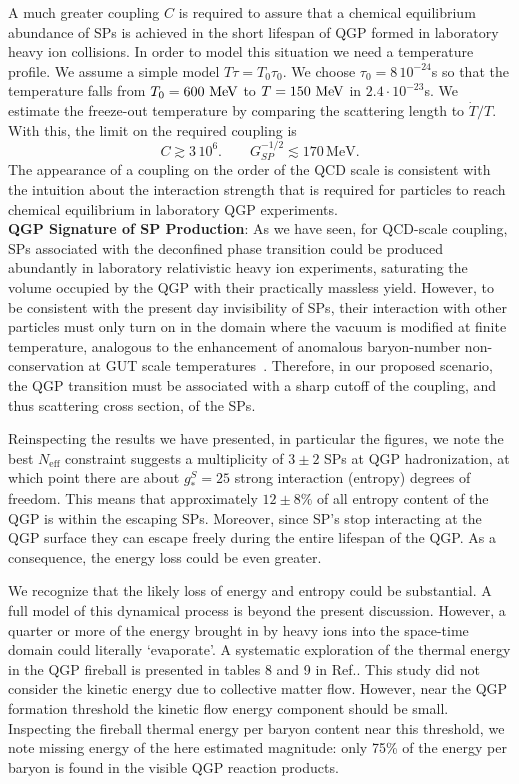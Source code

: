 A much greater coupling $C$ is required to assure that a chemical equilibrium abundance of SPs is achieved in the short lifespan of QGP formed in laboratory  heavy ion collisions. In order to model this situation we need a   temperature profile. We assume a simple model $T\tau =T_0\tau_0$. We choose  $\tau_0=8\, 10^{-24}$s  so that the temperature  falls from $T_0=600\text{ MeV}$ to $T=150\text{ MeV}$ in   $2.4\cdot 10^{-23}$s. We estimate the freeze-out temperature by comparing the scattering length to $\dot{T}/T$. With this, the limit on the required coupling is
\begin{equation}
C\gtrsim 3\, 10^6. \quad \quad   G_{SP}^{-1/2}\lesssim  170\,\mathrm{MeV}.
\end{equation}
The appearance of a coupling on the order of the QCD scale  is consistent with the intuition about the interaction strength that is required for   particles to reach chemical equilibrium in laboratory  QGP experiments.\\[-0.2cm]

{\bf QGP Signature of SP Production}:  As we have seen, for QCD-scale coupling, SPs associated with the deconfined phase transition could be produced abundantly in laboratory relativistic heavy ion experiments, saturating the volume occupied by the QGP with their practically massless yield.  However, to be consistent with the present day invisibility of SPs, their interaction with other particles must only turn on in the domain where the vacuum is modified at finite temperature, analogous to the enhancement of anomalous baryon-number non-conservation at GUT scale temperatures~\cite{Kuzmin:1985mm}.  Therefore, in our proposed scenario, the QGP transition must be associated with a sharp cutoff of the coupling, and thus  scattering cross section,  of the SPs.

Reinspecting the results we have presented,  in particular the  figures, we note the best $N_{\text{eff}}$ constraint suggests a multiplicity of $3\pm 2$ SPs at QGP hadronization,  at which point there are about $g_*^S=25$ strong interaction (entropy) degrees of freedom. This means that approximately $12\pm 8\%$ of all entropy content of the QGP  is within the escaping SPs.  Moreover, since SP's stop interacting at the QGP surface they can escape freely during the entire lifespan of the QGP. As a consequence, the energy loss could be even greater.

We recognize  that the likely loss of energy and entropy could be substantial. A full model of this dynamical process is beyond the present discussion.  However, a quarter or more of the energy brought in by heavy ions into the space-time domain could literally `evaporate'. A systematic exploration of the thermal energy in the QGP fireball  is presented in tables 8 and 9 in Ref.\cite{Letessier:2005qe}. This study did not consider the kinetic energy due to collective matter flow.  However, near   the QGP formation threshold   the  kinetic flow energy component should be small. Inspecting the fireball thermal energy per baryon content near this threshold, we note missing energy of the  here estimated magnitude:   only 75\% of the energy per baryon is found in the visible QGP reaction products.


